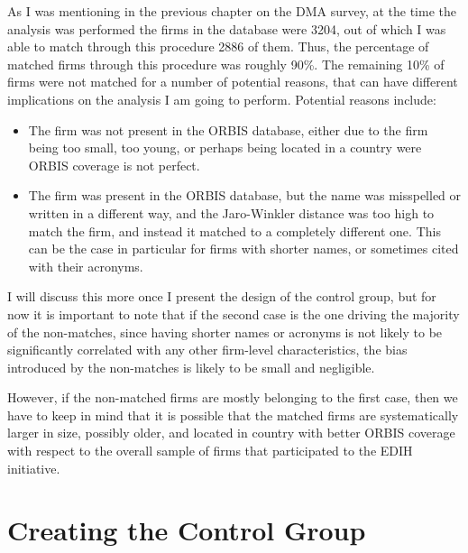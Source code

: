 \documentclass[12pt]{report}
\begin{document}
\par As I was mentioning in the previous chapter on the DMA survey, at the time the analysis was performed the firms in the database were 3204, out of which I was able to match through this procedure 2886 of them. Thus, the percentage of matched firms through this procedure was roughly 90\%. The remaining 10\% of firms were not matched for a number of potential reasons, that can have different implications on the analysis I am going to perform. Potential reasons include:
\begin{itemize}
    \item The firm was not present in the ORBIS database, either due to the firm being too small, too young, or perhaps being located in a country were ORBIS coverage is not perfect.
    \item The firm was present in the ORBIS database, but the name was misspelled or written in a different way, and the Jaro-Winkler distance was too high to match the firm, and instead it matched to a completely different one. This can be the case in particular for firms with shorter names, or sometimes cited with their acronyms.
\end{itemize}
\par I will discuss this more once I present the design of the control group, but for now it is important to note that if the second case is the one driving the majority of the non-matches, since having shorter names or acronyms is not likely to be significantly correlated with any other firm-level characteristics, the bias introduced by the non-matches is likely to be small and negligible.
\par However, if the non-matched firms are mostly belonging to the first case, then we have to keep in mind that it is possible that the matched firms are systematically larger in size, possibly older, and located in country with better ORBIS coverage with respect to the overall sample of firms that participated to the EDIH initiative.


\section{Creating the Control Group}
\end{document}
